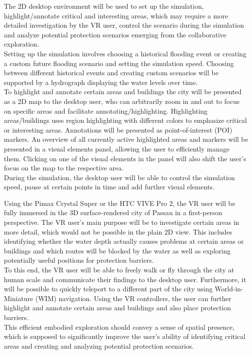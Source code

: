 \documentclass[a4paper,11pt]{article}
\begin{document}
The 2D desktop environment will be used to set up the simulation, highlight/annotate critical and interesting areas, which may require a more detailed investigation by the VR user, control the scenario during the simulation and analyze potential protection scenarios emerging from the collaborative exploration. \\
Setting up the simulation involves choosing a historical flooding event or creating a custom future flooding scenario and setting the simulation speed. Choosing between different historical events and creating custom scenarios will be supported by a hydrograph displaying the water levels over time. \\
To highlight and annotate certain areas and buildings the city will be presented as a 2D map to the desktop user, who can arbitrarily zoom in and out to focus on specific areas and facilitate annotating/highlighting. Highlighting areas/buildings uses region highlighting with different colors to emphasize critical or interesting areas. Annotations will be presented as point-of-interest (POI) markers. An overview of all currently active highlighted areas and markers will be presented in a visual elements panel, allowing the user to efficiently manage them. Clicking on one of the visual elements in the panel will also shift the user's focus on the map to the respective area.\\
During the simulation, the desktop user will be able to control the simulation speed, pause at certain points in time and add further visual elements.

Using the Pimax Crystal Super or the HTC VIVE Pro 2, the VR user will be fully immersed in the 3D surface-rendered city of Passau in a first-person perspective. The VR user's main purpose will be to investigate certain areas in more detail, which would not be possible in the plain 2D view. This includes identifying whether the water depth actually causes problems at certain areas or buildings and which routes will be blocked by the water as well as exploring potentially useful positions for protection barriers.\\
To this end, the VR user will be able to freely walk or fly through the city at human scale and communicate their findings to the desktop user. Furthermore, it will be possible to quickly teleport to a different part of the city using World-in-Miniature (WIM) navigation. Using the VR controllers, the user can further highlight and annotate certain areas and buildings and also place protection barriers.\\
This efficient embodied exploration should convey a sense of spatial presence, which is supposed to significantly improve the user's ability of identifying critical areas and creating and analyzing potential protection scenarios. 
\end{document}
